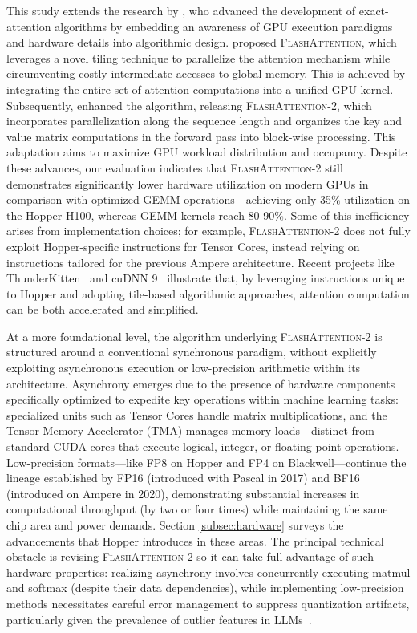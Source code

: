 This study extends the research by \citet{dao2022flashattention}, who advanced the development of exact-attention algorithms by embedding an awareness of GPU execution paradigms and hardware details into algorithmic design. \citet{dao2022flashattention} proposed \textsc{FlashAttention}, which leverages a novel tiling technique to parallelize the attention mechanism while circumventing costly intermediate accesses to global memory. This is achieved by integrating the entire set of attention computations into a unified GPU kernel. Subsequently, \citet{dao2023flashattention2} enhanced the algorithm, releasing \textsc{FlashAttention-2}, which incorporates parallelization along the sequence length and organizes the key and value matrix computations in the forward pass into block-wise processing. This adaptation aims to maximize GPU workload distribution and occupancy. Despite these advances, our evaluation indicates that \textsc{FlashAttention-2} still demonstrates significantly lower hardware utilization on modern GPUs in comparison with optimized GEMM operations—achieving only 35\% utilization on the Hopper H100, whereas GEMM kernels reach 80-90\%. Some of this inefficiency arises from implementation choices; for example, \textsc{FlashAttention-2} does not fully exploit Hopper-specific instructions for Tensor Cores, instead relying on instructions tailored for the previous Ampere architecture. Recent projects like ThunderKitten~\citep{spector2024thunder} and cuDNN 9~\citep{cudnn9} illustrate that, by leveraging instructions unique to Hopper and adopting tile-based algorithmic approaches, attention computation can be both accelerated and simplified.

At a more foundational level, the algorithm underlying \textsc{FlashAttention-2} is structured around a conventional synchronous paradigm, without explicitly exploiting asynchronous execution or low-precision arithmetic within its architecture. Asynchrony emerges due to the presence of hardware components specifically optimized to expedite key operations within machine learning tasks: specialized units such as Tensor Cores handle matrix multiplications, and the Tensor Memory Accelerator (TMA) manages memory loads—distinct from standard CUDA cores that execute logical, integer, or floating-point operations. Low-precision formats—like FP8 on Hopper and FP4 on Blackwell—continue the lineage established by FP16 (introduced with Pascal in 2017) and BF16 (introduced on Ampere in 2020), demonstrating substantial increases in computational throughput (by two or four times) while maintaining the same chip area and power demands. Section \cref{subsec:hardware} surveys the advancements that Hopper introduces in these areas. The principal technical obstacle is revising \textsc{FlashAttention-2} so it can take full advantage of such hardware properties: realizing asynchrony involves concurrently executing matmul and softmax (despite their data dependencies), while implementing low-precision methods necessitates careful error management to suppress quantization artifacts, particularly given the prevalence of outlier features in LLMs~\citep{dettmers2208llm, sun2024massive}.

